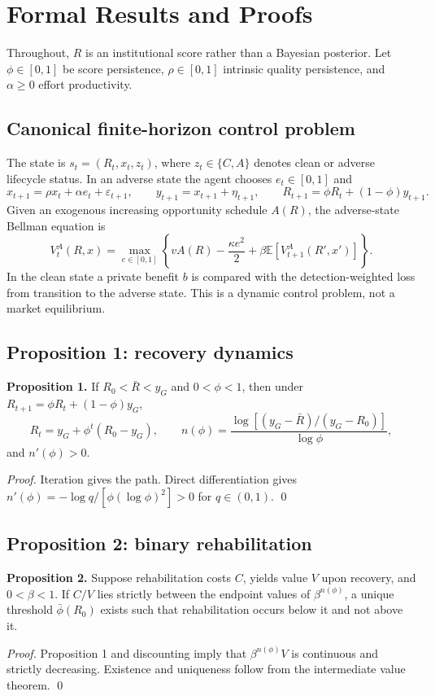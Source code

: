 \section{Formal Results and Proofs}

Throughout, $R$ is an institutional score rather than a Bayesian posterior. Let $\phi\in[0,1]$ be score persistence, $\rho\in[0,1]$ intrinsic quality persistence, and $\alpha\geq0$ effort productivity.

\subsection{Canonical finite-horizon control problem}
The state is $s_t=(R_t,x_t,z_t)$, where $z_t\in\{C,A\}$ denotes clean or adverse lifecycle status. In an adverse state the agent chooses $e_t\in[0,1]$ and
\[
x_{t+1}=\rho x_t+\alpha e_t+\varepsilon_{t+1},\qquad
y_{t+1}=x_{t+1}+\eta_{t+1},\qquad
R_{t+1}=\phi R_t+(1-\phi)y_{t+1}.
\]
Given an exogenous increasing opportunity schedule $A(R)$, the adverse-state Bellman equation is
\[
V_t^A(R,x)=\max_{e\in[0,1]}\left\{vA(R)-\frac{\kappa e^2}{2}
+\beta\mathbb E[V_{t+1}^A(R',x')]\right\}.
\]
In the clean state a private benefit $b$ is compared with the detection-weighted loss from transition to the adverse state. This is a dynamic control problem, not a market equilibrium.

\subsection{Proposition 1: recovery dynamics}
\textbf{Proposition 1.} If $R_0<\bar R<y_G$ and $0<\phi<1$, then under $R_{t+1}=\phi R_t+(1-\phi)y_G$,
\[
R_t=y_G+\phi^t(R_0-y_G),\qquad
n(\phi)=\frac{\log[(y_G-\bar R)/(y_G-R_0)]}{\log\phi},
\]
and $n'(\phi)>0$.

\textit{Proof.} Iteration gives the path. Direct differentiation gives
$n'(\phi)=-\log q/[\phi(\log\phi)^2]>0$ for $q\in(0,1)$. \qed

\subsection{Proposition 2: binary rehabilitation}
\textbf{Proposition 2.} Suppose rehabilitation costs $C$, yields value $V$ upon recovery, and $0<\beta<1$. If $C/V$ lies strictly between the endpoint values of $\beta^{n(\phi)}$, a unique threshold $\bar\phi(R_0)$ exists such that rehabilitation occurs below it and not above it.

\textit{Proof.} Proposition 1 and discounting imply that $\beta^{n(\phi)}V$ is continuous and strictly decreasing. Existence and uniqueness follow from the intermediate value theorem. \qed

